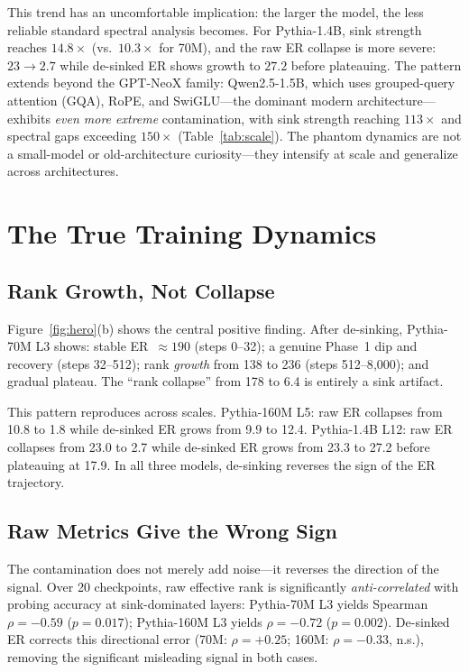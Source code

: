 \documentclass[11pt]{article}
\begin{document}
This trend has an uncomfortable implication: the larger the model, the less reliable standard spectral analysis becomes.
For Pythia-1.4B, sink strength reaches $14.8\times$ (vs.\ $10.3\times$ for 70M), and the raw ER collapse is more severe: $23 \to 2.7$ while de-sinked ER shows growth to $27.2$ before plateauing.
The pattern extends beyond the GPT-NeoX family: Qwen2.5-1.5B, which uses grouped-query attention (GQA), RoPE, and SwiGLU---the dominant modern architecture---exhibits \emph{even more extreme} contamination, with sink strength reaching $113\times$ and spectral gaps exceeding $150\times$ (Table~\ref{tab:scale}).
The phantom dynamics are not a small-model or old-architecture curiosity---they intensify at scale and generalize across architectures.

\section{The True Training Dynamics}\label{sec:true}

\subsection{Rank Growth, Not Collapse}\label{sec:growth}

Figure~\ref{fig:hero}(b) shows the central positive finding.
After de-sinking, Pythia-70M L3 shows: stable ER~$\approx 190$ (steps 0--32); a genuine Phase~1 dip and recovery (steps 32--512); rank \emph{growth} from 138 to 236 (steps 512--8{,}000); and gradual plateau.
The ``rank collapse'' from 178 to 6.4 is entirely a sink artifact.

This pattern reproduces across scales.
Pythia-160M L5: raw ER collapses from 10.8 to 1.8 while de-sinked ER grows from 9.9 to 12.4.
Pythia-1.4B L12: raw ER collapses from 23.0 to 2.7 while de-sinked ER grows from 23.3 to 27.2 before plateauing at 17.9.
In all three models, de-sinking reverses the sign of the ER trajectory.

\subsection{Raw Metrics Give the Wrong Sign}\label{sec:misleading}

The contamination does not merely add noise---it reverses the direction of the signal.
Over 20 checkpoints, raw effective rank is significantly \emph{anti-correlated} with probing accuracy at sink-dominated layers: Pythia-70M L3 yields Spearman $\rho = -0.59$ ($p = 0.017$); Pythia-160M L3 yields $\rho = -0.72$ ($p = 0.002$).
De-sinked ER corrects this directional error (70M: $\rho = +0.25$; 160M: $\rho = -0.33$, n.s.), removing the significant misleading signal in both cases.
\end{document}
